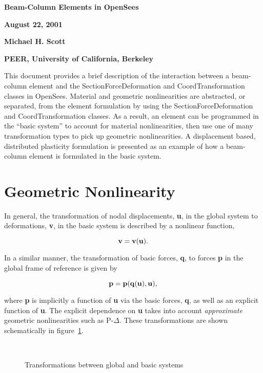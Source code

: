 \documentclass[12pt]{article}
\begin{document}
\newcommand{\pd}[2]{\frac{\partial{#1}}{\partial{#2}}}

\begin{center}
{\bf \Large Beam-Column Elements in OpenSees}

{\bf August 22, 2001} 

{\bf Michael H. Scott} 

{\bf PEER, University of California, Berkeley}
\end{center}

This document provides a brief description of the interaction between a beam-column
element and the SectionForceDeformation and CoordTransformation classes in OpenSees.
Material and geometric nonlinearities are abstracted, or separated, from the
element formulation by using the SectionForceDeformation and CoordTransformation
classes. As a result, an element can be programmed in the ``basic system'' to account
for material nonlinearities, then use one of many transformation types to pick
up geometric nonlinearities.
A displacement based, distributed plasticity formulation is presented as an
example of how a beam-column element is formulated in the basic system.

\section{Geometric Nonlinearity}
In general, the transformation of nodal displacements, {\bf u}, in the global system
to deformations, {\bf v}, in the basic system is described by a nonlinear
function,

\begin{equation}
\label{eq:v=v(u)}
{\bf v} = {\bf v}({\bf u}).
\end{equation}

In a similar manner, the transformation of basic forces, {\bf q}, to forces
{\bf p} in the global frame of reference is given by

\begin{equation}
\label{eq:p=p(q,u)}
{\bf p} = {\bf p}({\bf q}({\bf u}), {\bf u}),
\end{equation}

\noindent where {\bf p} is implicitly a function of {\bf u} via the basic forces,
{\bf q}, as well as an explicit function of {\bf u}. The explicit dependence on
{\bf u} takes into account {\em approximate} geometric nonlinearities such as
P-$\Delta$. These transformations are shown schematically in
figure~\ref{fig:Transformation}.

\begin{figure}[htpb]
\begin{center}
\leavevmode
\hbox{%
\epsfxsize=6.0in
}
\end{center}
\caption{Transformations between global and basic systems}
\label{fig:Transformation}
\end{figure}
\end{document}
